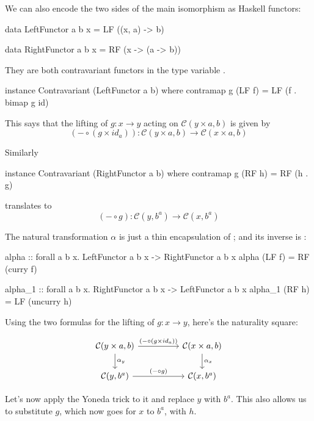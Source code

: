 \documentclass[DaoFP]{subfiles}
\begin{document}
We can also encode the two sides of the main isomorphism as Haskell functors:
\begin{haskell}
data LeftFunctor  a b x = LF ((x, a) -> b)
\end{haskell}
\begin{haskell}
data RightFunctor a b x = RF (x -> (a -> b))
\end{haskell}
They are both contravariant functors in the type variable .
\begin{haskell}
instance Contravariant (LeftFunctor a b) where
  contramap g (LF f) = LF (f . bimap g id)
\end{haskell}
This says that the lifting of $g \colon x \to y$ acting on $ \mathcal{C}(y \times a, b)$ is given by
\[ (- \circ (g \times id_a)) \colon\mathcal{C}(y \times a, b) \to  \mathcal{C}(x \times a, b)\]

Similarly
\begin{haskell}
instance Contravariant (RightFunctor a b) where
  contramap g (RF h) = RF (h . g)
\end{haskell}
translates to 
\[ (- \circ g) \colon  \mathcal{C}(y, b^a) \to \mathcal{C}(x, b^a) \]

The natural transformation $\alpha$ is just a thin encapsulation of ; and its inverse is :

\begin{haskell}
alpha :: forall a b x. LeftFunctor a b x -> RightFunctor a b x
alpha (LF f) = RF (curry f)
\end{haskell}

\begin{haskell}
alpha_1 :: forall a b x. RightFunctor a b x -> LeftFunctor a b x
alpha_1 (RF h) = LF (uncurry h)
\end{haskell}

Using the two formulas for the lifting of $g \colon x \to y$, here's the naturality square:

\[
 \begin{tikzcd}
 \mathcal{C}(y \times a, b)
 \arrow[rr, "(- \circ (g \times id_a))"]
 \arrow[d,  "\alpha_y"]
& &
\mathcal{C}(x \times a, b)
  \arrow[d, "\alpha_x"]
 \\
 \mathcal{C}(y, b^a)
 \arrow[rr, "(- \circ g)"]
& &
\mathcal{C}(x, b^a)
 \end{tikzcd}
\]

Let's now apply the Yoneda trick to it and replace $y$ with $b^a$. This also allows us to substitute $g$, which now goes for $x$ to $b^a$, with $h$. 
\end{document}
